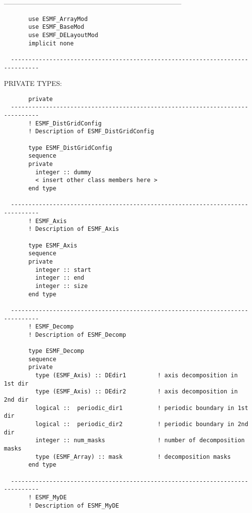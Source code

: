   ------------------------------------------------------------------------------
\begin{verbatim}       use ESMF_ArrayMod
       use ESMF_BaseMod
       use ESMF_DELayoutMod
       implicit none
 
  ------------------------------------------------------------------------------\end{verbatim}{\sf PRIVATE TYPES:}
\begin{verbatim}       private
  ------------------------------------------------------------------------------
       ! ESMF_DistGridConfig
       ! Description of ESMF_DistGridConfig
 
       type ESMF_DistGridConfig
       sequence
       private
         integer :: dummy
         < insert other class members here >
       end type
 
  ------------------------------------------------------------------------------
       ! ESMF_Axis
       ! Description of ESMF_Axis
 
       type ESMF_Axis
       sequence
       private
         integer :: start
         integer :: end
         integer :: size
       end type
 
  ------------------------------------------------------------------------------
       ! ESMF_Decomp
       ! Description of ESMF_Decomp
 
       type ESMF_Decomp
       sequence
       private
         type (ESMF_Axis) :: DEdir1         ! axis decomposition in 1st dir
         type (ESMF_Axis) :: DEdir2         ! axis decomposition in 2nd dir
         logical ::  periodic_dir1          ! periodic boundary in 1st dir
         logical ::  periodic_dir2          ! periodic boundary in 2nd dir
         integer :: num_masks               ! number of decomposition masks
         type (ESMF_Array) :: mask          ! decomposition masks
       end type
 
  ------------------------------------------------------------------------------
       ! ESMF_MyDE
       ! Description of ESMF_MyDE
 

\end{verbatim}
